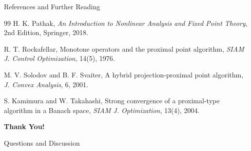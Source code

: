\documentclass[aspectratio=169,10pt]{beamer}
\begin{document}
\begin{frame}{References and Further Reading}
    \begin{thebibliography}{99}
         H. K. Pathak, \emph{An Introduction to Nonlinear Analysis
        and Fixed Point Theory}, 2nd Edition, Springer, 2018.

         R. T. Rockafellar, Monotone operators and the proximal
        point algorithm, \emph{SIAM J. Control Optimization}, 14(5), 1976.

         M. V. Solodov and B. F. Svaiter, A hybrid projection-proximal
        point algorithm, \emph{J. Convex Analysis}, 6, 2001.

         S. Kamimura and W. Takahashi, Strong convergence of a proximal-type
        algorithm in a Banach space, \emph{SIAM J. Optimization}, 13(4), 2004.
    \end{thebibliography}
\end{frame}

\begin{frame}
    \centering
    \Large
    \textbf{Thank You!}

    \vspace{1cm}

    Questions and Discussion
\end{frame}
\end{document}
